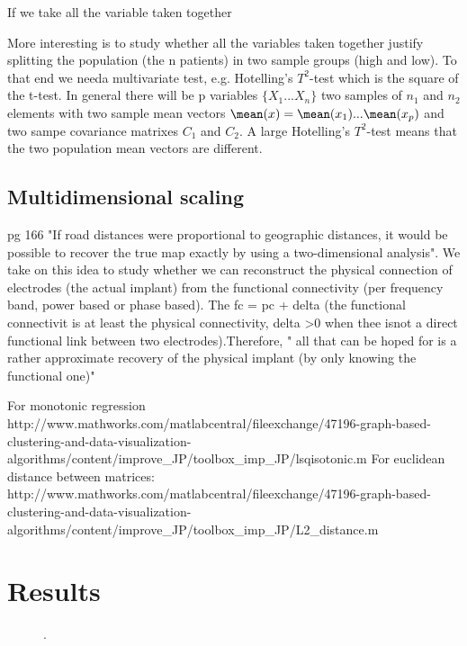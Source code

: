 \documentclass[11pt, onecolumn]{article}
\begin{document}
If we take all the variable taken together 





More interesting is to study whether all the variables taken together justify splitting the population (the n patients) in two sample groups (high and low). To that end we needa multivariate test, e.g. Hotelling's $T^2$-test which is  the square of the t-test.
In general there will be p variables $\{X_1 ... X_n\}$ two samples of $n_1$ and $n_2$ elements with two sample mean vectors $\mean(x) = \mean(x_1) ...\mean(x_p)$ and two sampe covariance matrixes $C_1$ and $C_2$.   A large Hotelling's $T^2$-test means that the two population mean vectors are different. 

\subsection*{Multidimensional scaling}
pg 166 "If road distances were proportional to geographic distances, it would be possible to recover the true map exactly by using a two-dimensional analysis". We take on this idea to study whether we can reconstruct the physical connection of electrodes (the actual implant) from the functional connectivity (per frequency band, power based or phase based). The fc = pc + delta (the functional connectivit is at least the physical connectivity, delta >0 when thee isnot a direct functional link between two electrodes).Therefore, "
all that can be hoped for is a rather approximate recovery of the
physical implant (by only knowing the functional one)"

For monotonic regression http://www.mathworks.com/matlabcentral/fileexchange/47196-graph-based-clustering-and-data-visualization-algorithms/content/improve_JP/toolbox_imp_JP/lsqisotonic.m
For euclidean distance between matrices:  http://www.mathworks.com/matlabcentral/fileexchange/47196-graph-based-clustering-and-data-visualization-algorithms/content/improve_JP/toolbox_imp_JP/L2_distance.m

\section{Results}
\label{se:results}



\begin{figure}[H]
    \hfill

    \caption{.}
    \label{fig:sims1}
\end{figure}

%

\end{document}
